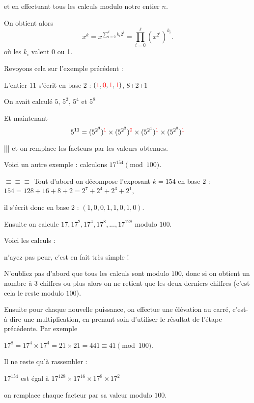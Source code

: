 et en effectuant tous les calculs modulo notre entier $n$.


\change
On obtient alors 
$$x^k = x^{\sum_{i=0}^\ell k_i 2^i} = \prod_{i=0}^\ell (x^{2^i})^{k_i}.$$
où les $k_i$ valent 0 ou 1.

\change
Revoyons cela sur l'exemple précédent :

L'entier $11$ s'écrit en base $2$ :
$({\color{red}1},{\color{red}0},{\color{red}1},{\color{red}1})$, 
8+2+1

\change
On avait calculé $5$, $5^2$, $5^4$ et $5^8$

\change
Et maintenant
$$5^{11} = (5^{2^3})^{{\color{red}1}} \times (5^{2^2})^{{\color{red}0}}
\times (5^{2^1})^{{\color{red}1}} \times (5^{2^0})^{{\color{red}1}}$$

|||
et on remplace les facteurs par les valeurs obtenues.


\diapo


Voici un autre exemple : calculons $17^{154} \pmod {100}$.

\change
$\equiv \equiv \equiv $
Tout d'abord on décompose l'exposant $k=154$ en base $2$ :
$154 = 128 + 16 + 8 + 2 = 2^7 + 2^4 + 2^3 + 2^1$, 

\change
il s'écrit donc en base $2$ : $(1,0,0,1,1,0,1,0)$.

\change
Ensuite on calcule $17, 17^2, 17^4, 17^8,...,17^{128}$ modulo $100$.

Voici les calculs :

n'ayez pas peur, c'est en fait très simple !

N'oubliez pas d'abord que tous les calculs sont modulo $100$,
donc si on obtient un nombre à 3 chiffres ou plus alors 
on ne retient que les deux derniers chiffres (c'est cela le reste modulo $100$).

Ensuite 
pour chaque nouvelle puissance,
on effectue une élévation au carré, c'est-à-dire une multiplication,
 en prenant soin d'utiliser le résultat de l'étape précédente.
Par exemple 

$17^8=17^4 \times 17^4=21\times 21=441\equiv 41 \pmod{100}$.



\change
Il ne reste qu'à rassembler :

$17^{154}$ est égal à  $17^{128} \times 17^{16} \times 17^{8} \times 17^{2}$

on remplace chaque facteur par sa valeur modulo $100$.

